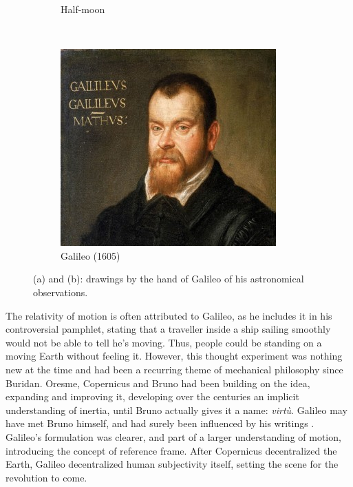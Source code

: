 \begin{figure}
\begin{subfigure}[b]{0.3\textwidth}
        \caption{Half-moon}
        \label{Fig:0_galileo_2}
    \end{subfigure}
        ~~
    \begin{subfigure}[b]{0.3\textwidth}
    	\centering
    	\includegraphics[width=\linewidth]{Figures/0_young_galileo.jpg}
        \caption{Galileo (1605)}
        \label{Fig:0_galileo_3}
    \end{subfigure}
\caption{(a) and (b): drawings by the hand of Galileo of his astronomical observations.}
\label{Fig:0_galileo}
\end{figure}


The relativity of motion is often attributed to Galileo, as he includes it in his controversial pamphlet, stating that a traveller inside a ship sailing smoothly would not be able to tell he's moving. Thus, people could be standing on a moving Earth without feeling it. However, this thought experiment was nothing new at the time and had been a recurring theme of mechanical philosophy since Buridan. Oresme, Copernicus and Bruno had been building on the idea, expanding and improving it, developing over the centuries an implicit understanding of inertia, until Bruno actually gives it a name: \textit{virt\`u}. Galileo may have met Bruno himself, and had surely been influenced by his writings \citep{DeAngelis2015}. Galileo's formulation was clearer, and part of a larger understanding of motion, introducing the concept of reference frame. After Copernicus decentralized the Earth, Galileo decentralized human subjectivity itself, setting the scene for the revolution to come. 

